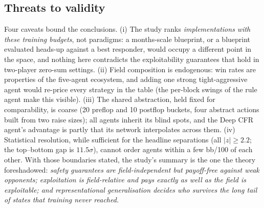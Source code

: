 \subsection{Threats to validity}

Four caveats bound the conclusions. (i) The study ranks \emph{implementations with these training budgets}, not paradigms: a months-scale blueprint, or a blueprint evaluated heads-up against a best responder, would occupy a different point in the space, and nothing here contradicts the exploitability guarantees that hold in two-player zero-sum settings. (ii) Field composition is endogenous: win rates are properties of the five-agent ecosystem, and adding one strong tight-aggressive agent would re-price every strategy in the table (the per-block swings of the rule agent make this visible). (iii) The shared abstraction, held fixed for comparability, is coarse (20 preflop and 10 postflop buckets, four abstract actions built from two raise sizes); all agents inherit its blind spots, and the Deep CFR agent's advantage is partly that its network interpolates across them. (iv) Statistical resolution, while sufficient for the headline separations (all $|z| \ge 2.2$; the top--bottom gap is $11.5\sigma$), cannot order agents within a few bb/100 of each other. With those boundaries stated, the study's summary is the one the theory foreshadowed: \emph{safety guarantees are field-independent but payoff-free against weak opponents; exploitation is field-relative and pays exactly as well as the field is exploitable; and representational generalisation decides who survives the long tail of states that training never reached.}
